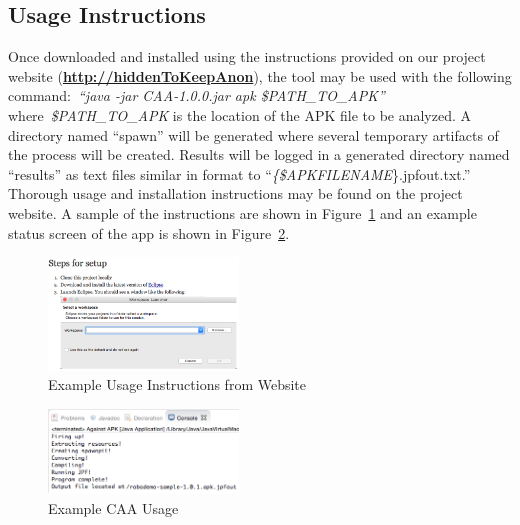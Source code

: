 \documentclass{sig-alternate}
\newif\ifisnopii
\begin{document}
\subsection{Usage Instructions}

Once downloaded and installed using the instructions provided on our project website (\textbf{\ifisnopii \url{http://darwin.rit.edu/caa/} \else \url{http://hiddenToKeepAnon}\fi}), the tool may be used with the following command:~\emph{``java -jar CAA-1.0.0.jar \-apk \$PATH\_TO\_APK''} where~\emph{\$PATH\_TO\_APK} is the location of the APK file to be analyzed. A directory named ``spawn'' will be generated where several temporary artifacts of the process will be created. Results will be logged in a generated directory named ``results'' as text files similar in format to ``\emph{\{\$APKFILENAME}\}.jpfout.txt.'' Thorough usage and installation instructions may be found on the project website. A sample of the instructions are shown in
Figure~\ref{fig:CAAinstructions} and an example status screen of the app is shown in Figure~\ref{fig:usingCAA}.

\begin{figure}[ht!]
\centering
\includegraphics[width=0.45\textwidth]{images/instructionsscreenshot.png}
\caption{Example Usage Instructions from Website}
\label{fig:CAAinstructions}
\end{figure}


\begin{figure}[ht!]
\centering
\includegraphics[width=0.45\textwidth]{images/CAA_Eclipse_small.png}
\caption{Example CAA Usage}
\label{fig:usingCAA}
\end{figure}
\end{document}
